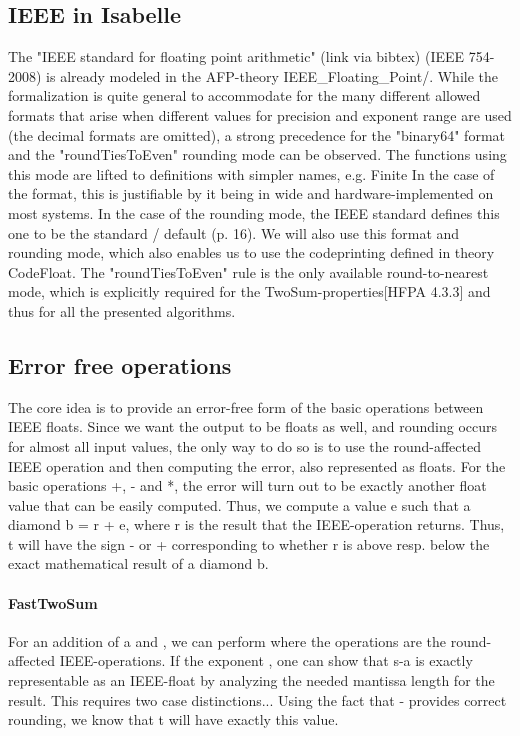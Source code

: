 \documentclass[11pt,a4paper]{article}
\begin{document}
\subsection{IEEE in Isabelle}

The "IEEE standard for floating point arithmetic" (link via bibtex) (IEEE 754-2008) is already modeled in the AFP-theory IEEE\_Floating\_Point/\IEEE.
While the formalization is quite general to accommodate for the many different allowed formats that arise when different values for precision and exponent range are used (the decimal formats are omitted), a strong precedence for the "binary64" format and the "roundTiesToEven" rounding mode can be observed. The functions using this mode are lifted to definitions with simpler names, e.g. Finite
In the case of the format, this is justifiable by it being in wide and hardware-implemented on most systems.
In the case of the rounding mode, the IEEE standard defines this one to be the standard / default (p. 16).
We will also use this format and rounding mode, which also enables us to use the codeprinting defined in theory CodeFloat. The "roundTiesToEven" rule is the only available round-to-nearest mode, which is explicitly required for the TwoSum-properties[HFPA 4.3.3] and thus for all the presented algorithms.

\subsection{Error free operations}

The core idea is to provide an error-free form of the basic operations between IEEE floats. Since we want the output to be floats as well, and rounding occurs for almost all input values, the only way to do so is to use the round-affected IEEE operation and then computing the error, also represented as floats. For the basic operations +, - and *, the error will turn out to be exactly another float value that can be easily computed. Thus, we compute a value e such that a diamond b = r + e,
where r is the result that the IEEE-operation returns.
Thus, t will have the sign - or + corresponding to whether r is above resp. below the exact mathematical result of a diamond b.

%
\paragraph{FastTwoSum}
For an addition of a and , we can perform 
where the operations are the round-affected IEEE-operations.
If the exponent , one can show that s-a is exactly representable as an IEEE-float by analyzing the needed mantissa length for the result. This requires two case distinctions... Using the fact that - provides correct rounding, we know that t will have exactly this value.
\end{document}

